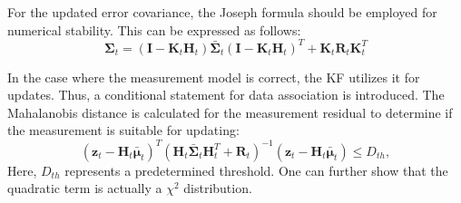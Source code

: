 \documentclass[12pt, a4paper]{article}
\begin{document}
For the updated error covariance, the Joseph formula should be employed for numerical stability. This can be expressed as follows:
\[
  \bm{\Sigma}_{t} = (\bm{I}-\bm{K}_{t}\bm{H}_{t})\bar{\bm{\Sigma}}_{t}(\bm{I}-\bm{K}_{t}\bm{H}_{t})^{T}+\bm{K}_{t}\bm{R}_{t}\bm{K}_{t}^{T}
\]

In the case where the measurement model is correct, the KF utilizes it for updates. Thus, a conditional statement for data association is introduced. The Mahalanobis distance is calculated for the measurement residual to determine if the measurement is suitable for updating:
\[
  (\bm{z}_{t}-\bm{H}_{t}\bar{\bm{\mu}}_{t})^{T}(\bm{H}_{t}\bar{\bm{\Sigma}}_{t}\bm{H}_{t}^{T}+\bm{R}_{t})^{-1}(\bm{z}_{t}-\bm{H}_{t}\bar{\bm{\mu}}_{t}) \leq D_{th},
\]
Here, $D_{th}$ represents a predetermined threshold. One can further show that the quadratic term is actually a $\chi^{2}$ distribution.
\end{document}
